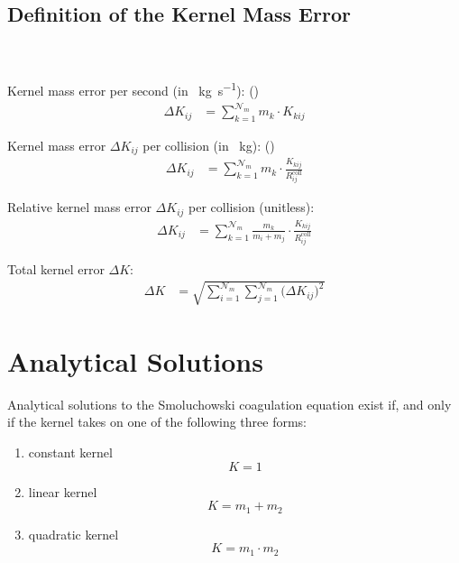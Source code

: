     \subsection{Definition of the Kernel Mass Error}

         \\
         \\

        Kernel mass error per second (in \SI{}{\kilogram\second^{-1}}): ()
        \begin{align}
            \Delta K_{ij}
                &=
                    \sum_{k=1}^{\mathcal N_m}m_k\cdot K_{kij}
        \end{align}
        
        Kernel mass error $\Delta K_{ij}$ per collision (in \SI{}{\kilogram}): 
        ()
        \begin{align}
            \Delta K_{ij}
                &=
                    \sum_{k=1}^{\mathcal N_m}m_k\cdot\frac{K_{kij}}{R^\text{coll}_{ij}}
        \end{align}
        
        Relative kernel mass error $\Delta K_{ij}$ per collision (unitless):
        \begin{align}
            \Delta K_{ij}
                &=
                    \sum_{k=1}^{\mathcal N_m}\frac{m_k}{m_i+m_j}\cdot\frac{K_{kij}}{R^\text{coll}_{ij}}
        \end{align}
        
        Total kernel error $\Delta K$:
        \begin{align}
            \Delta K
                &=
                    \sqrt{
                        \sum_{i=1}^{\mathcal N_m}
                        \sum_{j=1}^{\mathcal N_m}
                        \big(\Delta K_{ij}\big)^2
                    }
        \end{align}


\newpage\section{Analytical Solutions}

    Analytical solutions to the Smoluchowski coagulation equation exist if, and only if the kernel
    takes on one of the following three forms:
    \begin{enumerate}
        \item constant kernel
            $$K=1$$
        \item linear kernel
            $$K=m_1+m_2$$
        \item quadratic kernel
            $$K=m_1\cdot m_2$$
    \end{enumerate}


